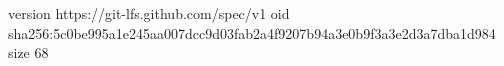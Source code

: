 version https://git-lfs.github.com/spec/v1
oid sha256:5c0be995a1e245aa007dcc9d03fab2a4f9207b94a3e0b9f3a3e2d3a7dba1d984
size 68
